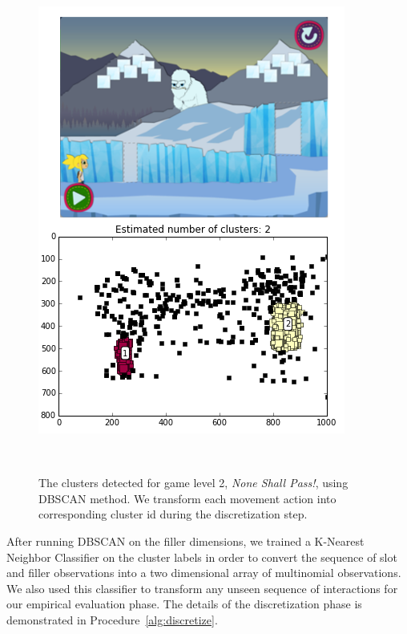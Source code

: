 \documentclass{sigchi}
\begin{document}
\begin{figure}
	\centering
	\includegraphics[width=0.9\columnwidth]{figures/glacier}
	\caption{The clusters detected for game level 2, \textit {None Shall Pass!}, using DBSCAN method. We transform each movement action into corresponding cluster id during the discretization step.}~\label{fig:figurecluster}
\end{figure}

After running DBSCAN on the filler dimensions, we trained a K-Nearest Neighbor Classifier on the cluster labels in order to convert the sequence of slot and filler observations into a two dimensional array of multinomial observations.
We also used this classifier to transform any unseen sequence of interactions for our empirical evaluation phase. The details of the discretization phase is demonstrated in Procedure~\ref{alg:discretize}.
\end{document}
